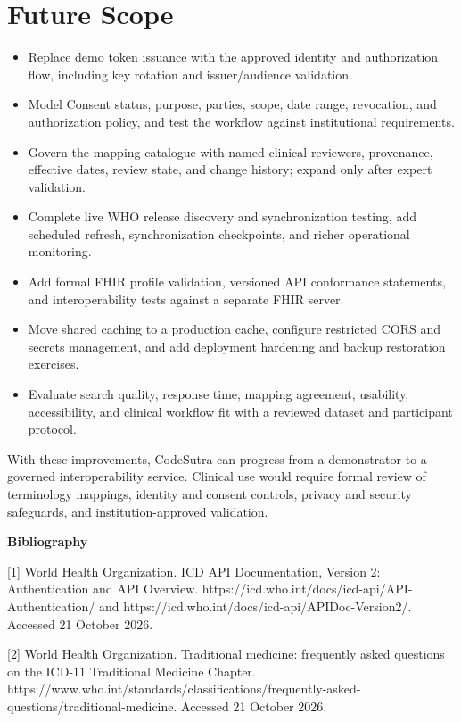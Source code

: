 \documentclass[12pt,a4paper,oneside]{report}
\begin{document}
\section*{Future Scope}
\begin{itemize}
\item Replace demo token issuance with the approved identity and authorization flow, including key rotation and issuer/audience validation.
\item Model Consent status, purpose, parties, scope, date range, revocation, and authorization policy, and test the workflow against institutional requirements.
\item Govern the mapping catalogue with named clinical reviewers, provenance, effective dates, review state, and change history; expand only after expert validation.
\item Complete live WHO release discovery and synchronization testing, add scheduled refresh, synchronization checkpoints, and richer operational monitoring.
\item Add formal FHIR profile validation, versioned API conformance statements, and interoperability tests against a separate FHIR server.
\item Move shared caching to a production cache, configure restricted CORS and secrets management, and add deployment hardening and backup restoration exercises.
\item Evaluate search quality, response time, mapping agreement, usability, accessibility, and clinical workflow fit with a reviewed dataset and participant protocol.
\end{itemize}
With these improvements, CodeSutra can progress from a demonstrator to a governed interoperability service. Clinical use would require formal review of terminology mappings, identity and consent controls, privacy and security safeguards, and institution-approved validation.

\clearpage
\clearpage\begin{center}\Large\textbf{\textbf{Bibliography}}\end{center}
[1] World Health Organization. ICD API Documentation, Version 2: Authentication and API Overview. https://icd.who.int/docs/icd-api/API-Authentication/ and https://icd.who.int/docs/icd-api/APIDoc-Version2/. Accessed 21 October 2026.

[2] World Health Organization. Traditional medicine: frequently asked questions on the ICD-11 Traditional Medicine Chapter. https://www.who.int/standards/classifications/frequently-asked-questions/traditional-medicine. Accessed 21 October 2026.
\end{document}
